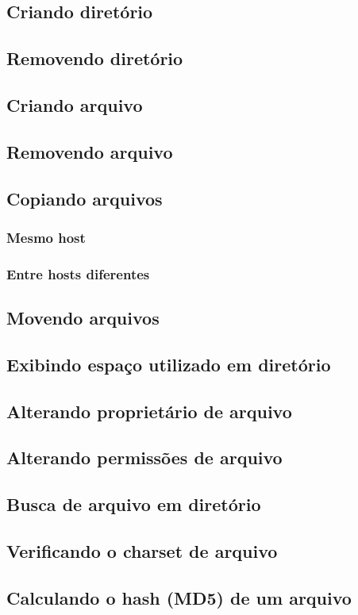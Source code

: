 \documentclass[a4paper,10pt]{article}
\begin{document}
\subsection{Criando diretório}
\subsection{Removendo diretório}
\subsection{Criando arquivo}
\subsection{Removendo arquivo}
\subsection{Copiando arquivos}
\subsubsection{Mesmo host}
\subsubsection{Entre hosts diferentes}
\subsection{Movendo arquivos}
\subsection{Exibindo espaço utilizado em diretório}
\subsection{Alterando proprietário de arquivo}
\subsection{Alterando permissões de arquivo}
\subsection{Busca de arquivo em diretório}
\subsection{Verificando o charset de arquivo}
\subsection{Calculando o hash (MD5) de um arquivo}
\end{document}
